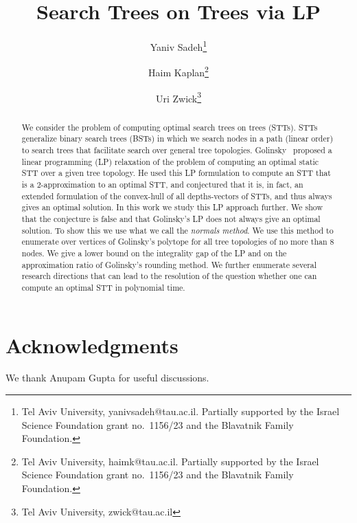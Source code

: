 \documentclass[11pt,conference,letterpaper,onecolumn]{article}
\title{Search Trees on Trees via LP}
\author{
Yaniv Sadeh\footnote{Tel Aviv University, yanivsadeh@tau.ac.il. Partially supported by the Israel Science Foundation grant no.\ 1156/23 and the Blavatnik Family Foundation.}
\and
Haim Kaplan\footnote{Tel Aviv University, haimk@tau.ac.il. Partially supported by the Israel Science Foundation grant no.\ 1156/23 and the Blavatnik Family Foundation.}
\and
Uri Zwick\footnote{Tel Aviv University, zwick@tau.ac.il}
}
\theoremstyle{definition} %
\begin{document}
\maketitle

\begin{abstract}
We consider the problem of computing optimal search trees on trees (STTs). STTs generalize binary search trees (BSTs) in which we search nodes in a path (linear order) to search trees that facilitate search over general tree topologies. Golinsky~\cite{GolinskyThesis} proposed a linear programming (LP) relaxation of the problem of computing an optimal static STT over a given tree topology. He used this LP formulation to compute an STT that is a $2$-approximation to an optimal STT, and conjectured that it is, in fact, an extended formulation of the convex-hull of all depths-vectors of STTs, and thus always gives an optimal solution. In this work we study this LP approach further. We show that the conjecture is false and that Golinsky's LP does not always give an optimal solution. 
To show this we use what we call the \emph{normals method}.
We use this method to enumerate over vertices of Golinsky's polytope for all tree topologies of no more than 8 nodes. We give a lower bound on the integrality gap of the LP and on the approximation ratio of Golinsky's rounding method. We further enumerate several research directions that can lead to the resolution of the question whether one can compute an optimal STT in polynomial time.
\end{abstract}










\section*{Acknowledgments}
We thank Anupam Gupta for useful discussions.


\appendix


\end{document}
